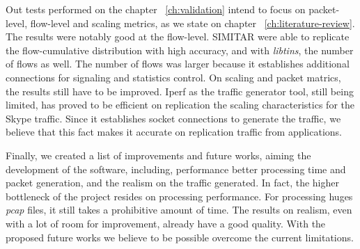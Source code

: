 Out tests performed on the chapter ~\ref{ch:validation} intend to focus on packet-level, flow-level and scaling metrics, as we state on chapter ~\ref{ch:literature-review}. The results were notably good at the flow-level. SIMITAR were able to replicate the flow-cumulative distribution with high accuracy, and with \textit{libtins}, the number of flows as well. The number of flows was larger because it establishes additional connections for signaling and statistics control. On scaling and packet matrics, the results still have to be improved. Iperf as the traffic generator tool, still being limited, has proved to be efficient on replication the scaling characteristics for the Skype traffic. Since it establishes socket connections to generate the traffic, we believe that this fact makes it accurate on replication traffic from applications. 


Finally, we created a list of improvements and future works, aiming the development of the software, including, performance better processing time and packet generation, and the realism on the traffic generated. In fact, the higher bottleneck of the project resides on processing performance. For processing huges \textit{pcap} files, it still takes a prohibitive amount of time. The results on realism, even with a lot of room for improvement, already have a good quality. With the proposed future works we believe to be possible overcome the current limitations.



